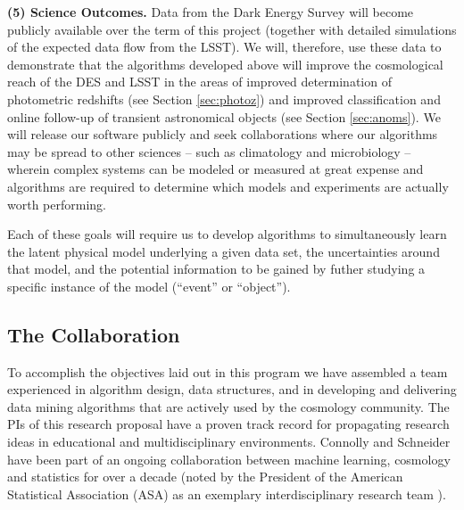 \documentclass[prd,nofootbib,floatfix,11pt,tightenlines]{revtex4}
\begin{document}
{\bf (5) Science Outcomes.}  Data from the Dark Energy Survey will become
publicly available over the term of this project (together with
detailed simulations of the expected data flow from the LSST).  We
will, therefore, use these data to demonstrate
that the algorithms developed above will improve the cosmological
reach of the DES and LSST in the areas of  
improved determination of photometric
redshifts (see Section \ref{sec:photoz}) and improved classification and online
follow-up of transient astronomical objects (see Section \ref{sec:anoms}).  We will release our software
publicly and seek collaborations where our algorithms may be spread to
other sciences -- such as climatology and microbiology -- wherein complex
systems can be modeled or measured at great expense and algorithms are
required to determine which models and experiments are actually worth
performing.

Each of these goals will require us to develop algorithms to simultaneously
learn the latent physical model underlying a given data set, the
uncertainties around that model, and the potential information to be gained
by futher studying a specific instance of the model (``event'' or
``object'').

\subsection{The Collaboration}

To accomplish the objectives laid out in this program we have
assembled a team experienced in algorithm design, data structures, and
in developing and delivering data mining algorithms that are actively
used by the cosmology community. The PIs of this research proposal
have a proven track record for propagating research ideas in
educational and multidisciplinary environments. Connolly and Schneider
have been part of an ongoing collaboration between machine learning,
cosmology and statistics for over a decade (noted by the President
of the American Statistical Association (ASA) as an exemplary
interdisciplinary research team \cite{straf03}).
\end{document}
